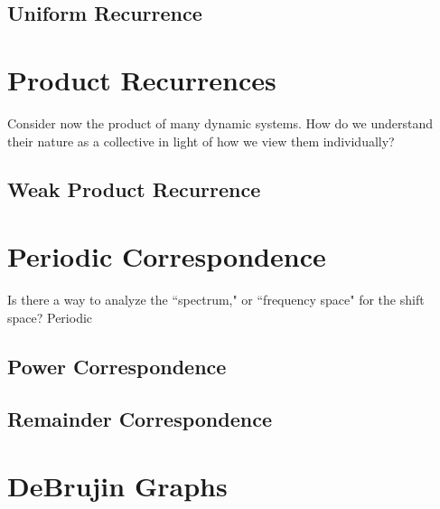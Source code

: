 \documentclass{article}
\begin{document}
\subsection{Uniform Recurrence}

\section{Product Recurrences}

Consider now the product of many dynamic systems. How do we understand their nature as a collective in light of how we view them individually?

\subsection{Weak Product Recurrence}

\section{Periodic Correspondence}

Is there a way to analyze the ``spectrum," or ``frequency space" for the shift space? Periodic

\subsection{Power Correspondence}

\subsection{Remainder Correspondence}

\section{DeBrujin Graphs}
\end{document}
